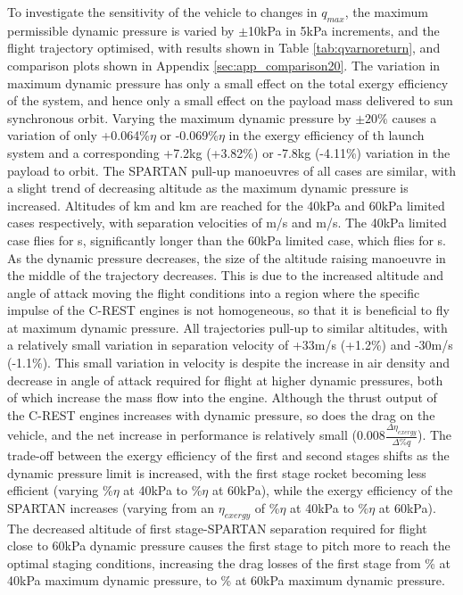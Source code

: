 To investigate the sensitivity of the vehicle to changes in $q_{max}$, the maximum permissible dynamic pressure is varied by $\pm$10kPa in 5kPa increments, and the flight trajectory optimised, with results shown in Table \ref{tab:qvarnoreturn}, and comparison plots shown in Appendix \ref{sec:app_comparison20}.
The variation in maximum dynamic pressure has only a small effect on the total exergy efficiency of the system, and hence only a small effect on the payload mass delivered to sun synchronous orbit.  Varying the maximum dynamic pressure by $\pm20\%$ causes a variation of only +0.064\%$\eta$ or -0.069\%$\eta$ in the exergy efficiency of th launch system and a corresponding +7.2kg (+3.82\%) or -7.8kg (-4.11\%) variation in the payload to orbit.  
The SPARTAN pull-up manoeuvres of all cases are similar, with a slight trend of decreasing altitude as the maximum dynamic pressure is increased. Altitudes of \secondthirdSeparationAltqFortyNoReturn km and \secondthirdSeparationAltqSixtyNoReturn km are reached for the 40kPa and 60kPa limited cases respectively, with separation velocities of \secondthirdSeparationvqFortyNoReturn m/s and \secondthirdSeparationvqSixtyNoReturn m/s. The 40kPa limited case flies for \secondFlightTimeqFortyNoReturn s, significantly longer than the 60kPa limited case, which flies for \secondFlightTimeqSixtyNoReturn s.
As the dynamic pressure decreases, the size of the altitude raising manoeuvre in the middle of the trajectory decreases. This is due to the increased altitude and angle of attack moving the flight conditions into a region where the specific impulse of the C-REST engines is not homogeneous, so that it is beneficial to fly at maximum dynamic pressure.  
All trajectories pull-up to similar altitudes, with a relatively small variation in separation velocity of +33m/s (+1.2\%) and -30m/s (-1.1\%).
This small variation in velocity is despite the increase in air density and decrease in angle of attack required for flight at higher dynamic pressures, both of which increase the mass flow into the engine. Although the thrust output of the C-REST engines increases with dynamic pressure, so does the drag on the vehicle, and the net increase in performance is relatively small (0.008$ \frac{\Delta\eta_{exergy}}{\Delta\%q}$). 
The trade-off between the exergy efficiency of the first and second stages shifts as the dynamic pressure limit is increased, with the first stage rocket becoming less efficient (varying \firstExergyEffqFortyNoReturn\%$\eta$ at 40kPa to \firstExergyEffqSixtyNoReturn\%$\eta$ at 60kPa), while the exergy efficiency of the SPARTAN increases (varying from an $\eta_{exergy}$ of \secondExergyEffqFortyNoReturn\%$\eta$ at 40kPa to \secondExergyEffqSixtyNoReturn\%$\eta$ at 60kPa). The decreased altitude of first stage-SPARTAN separation required for flight close to 60kPa dynamic pressure causes the first stage to pitch more to reach the optimal staging conditions, increasing the drag losses of the first stage from  \WDoneqFortyNoReturn\% at 40kPa maximum dynamic pressure, to \WDoneqSixtyNoReturn\% at 60kPa maximum dynamic pressure. 
